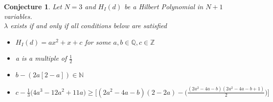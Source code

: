 \documentclass[11pt]{amsart}
\theoremstyle{plain}
\newtheorem{conjecture}[theorem]{Conjecture}
\theoremstyle{definition}
\begin{document}
\begin{conjecture}
Let $N=3$ and $H_I(d)$ be a Hilbert Polynomial in $N+1$ variables. \\
$\lambda$ exists if and only if all conditions below are satisfied
\begin{itemize}
\item $H_I(d)=ax^2+x+c$ for some $a,b\in \mathbb{Q}, c\in \mathbb{Z}$
\item a is a multiple of $\frac{1}{2}$ 
\item $b - (2a[2-a]) \in \mathbb{N}$
\item $c - \frac{1}{3}\big(4a^3-12a^2+11a\big)\geq  \Big[(2a^2-4a-b)(2-2a)-\Big(\frac{(2a^2-4a-b)(2a^2-4a-b+1)}{2}\Big)\Big]$

\end{itemize} 
\end{conjecture}
\end{document}
